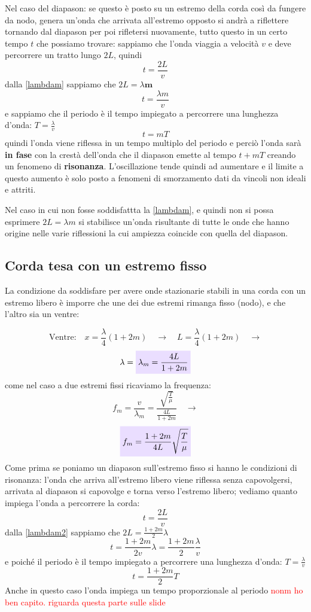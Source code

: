 \documentclass[x11names]{article}
\newcommand{\viola}[1]{\colorbox{myred}{$\displaystyle #1$}}
\begin{document}
		
		Nel caso del diapason: se questo è posto su un estremo della corda così da fungere da nodo, genera un'onda che arrivata all'estremo opposto si andrà a riflettere tornando dal diapason per poi rifletersi nuovamente, tutto questo in un certo tempo \(t\) che possiamo trovare: sappiamo che l'onda viaggia a velocità \(v\) e deve percorrere un tratto lungo \(2L\), quindi 
		\[ 
		t = \frac{2L}{v}
		\]
		dalla \ref{lambdam} sappiamo che \(2L = \lambda \boldsymbol{m}\)
		\[ 
		t = \frac{\lambda m}{v}
		\]
		e sappiamo che il periodo è il tempo impiegato a percorrere una lunghezza d'onda: \(T = \frac{\lambda}{v}\)
		\[ 
		t = mT
		\]
		quindi l'onda viene riflessa in un tempo multiplo del periodo e perciò l'onda sarà \textbf{in fase} con la crestà dell'onda che il diapason emette al tempo \(t + mT\) creando un fenomeno di \textbf{risonanza}. L'oscillazione tende quindi ad aumentare e il limite a questo aumento è solo posto a fenomeni di smorzamento dati da vincoli non ideali e attriti.
		
		Nel caso in cui non fosse soddisfattta la \ref{lambdam}, e quindi non si possa esprimere \(2L = \lambda m\) si stabilisce un'onda risultante di tutte le onde che hanno origine nelle varie riflessioni la cui ampiezza coincide con quella del diapason.
		
		\subsection{Corda tesa con un estremo fisso}
		La condizione da soddisfare per avere onde stazionarie stabili in una corda con un estremo libero è imporre che une dei due estremi rimanga fisso (nodo), e che l'altro sia un ventre:
		
		\[ 
		\text{Ventre:} \quad x = \frac{\lambda}{4}(1+2m) \quad \to \quad L = \frac{\lambda}{4}(1+2m) \quad \to 
		\]
		\begin{equation}\label{lambdam2}
			\lambda = \viola{\lambda_m  = \frac{4L}{1+2m}}
		\end{equation}
		come nel caso a due estremi fissi ricaviamo la frequenza:
		\[ 
		f_m = \frac{v}{\lambda_m} = \frac{\sqrt{\frac{T}{\mu}}}{\frac{4L}{1+2m}} \quad \to
		\]
		\begin{equation}
			\viola{f_m = \frac{1 + 2m}{4L} \sqrt{\frac{T}{\mu}}}
		\end{equation}
		Come prima se poniamo un diapason sull'estremo fisso si hanno le condizioni di risonanza: l'onda che arriva all'estremo libero viene riflessa senza capovolgersi, arrivata al diapason si capovolge e torna verso l'estremo libero; vediamo quanto impiega l'onda a percorrere la corda:
		\[ 
		t = \frac{2L}{v}
		\]
		dalla \ref{lambdam2} sappiamo che \(2L = \frac{1+2m}{2}\lambda\)
		\[ 
		t = \frac{1+2m}{2v}\lambda = \frac{1+2m}{2}\frac{\lambda}{v}
		\]
		e poiché il periodo è il tempo impiegato a percorrere una lunghezza d'onda: \(T=\frac{\lambda}{v}\)
		\[ 
		t = \frac{1+2m}{2}T
		\]
		Anche in questo caso l'onda impiega un tempo proporzionale al periodo \textcolor{red}{nonm ho ben capito. riguarda questa parte sulle slide}
		
\end{document}
